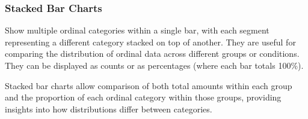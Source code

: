 \documentclass[
  letterpaper,
  DIV=11,
  numbers=noendperiod]{scrartcl}
\begin{document}
\hypertarget{stacked-bar-charts}{%
\subsubsection*{Stacked Bar Charts}\label{stacked-bar-charts}}

Show multiple ordinal categories within a single bar, with each segment
representing a different category stacked on top of another. They are
useful for comparing the distribution of ordinal data across different
groups or conditions. They can be displayed as counts or as percentages
(where each bar totals 100\%).

Stacked bar charts allow comparison of both total amounts within each
group and the proportion of each ordinal category within those groups,
providing insights into how distributions differ between categories.
\end{document}

